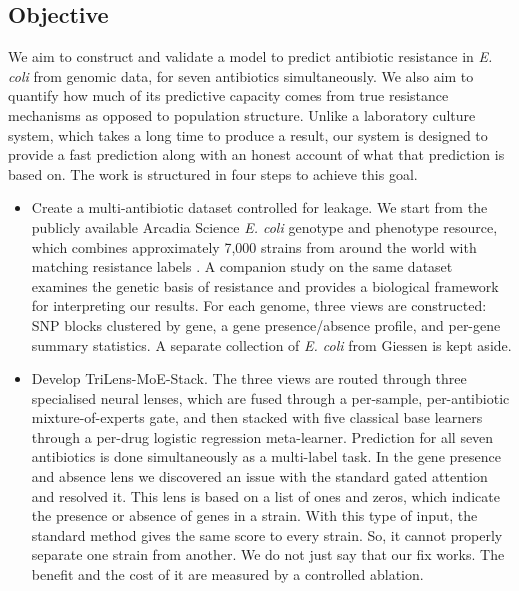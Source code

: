 \documentclass[journal]{IEEEtran}
\begin{document}
\subsection{Objective}

We aim to construct and validate a model to predict antibiotic resistance in
\textit{E. coli} from genomic data, for seven antibiotics simultaneously. We also
aim to quantify how much of its predictive capacity comes from true resistance
mechanisms as opposed to population structure. Unlike a laboratory culture system,
which takes a long time to produce a result, our system is designed to provide a
fast prediction along with an honest account of what that prediction is based on.
The work is structured in four steps to achieve this goal.

\begin{itemize}
\item Create a multi-antibiotic dataset controlled for leakage. We start from the
publicly available Arcadia Science \textit{E. coli} genotype and phenotype
resource, which combines approximately 7,000 strains from around the world with
matching resistance labels \cite{morin2024ecoli}. A companion study on the same
dataset \cite{york2025amr} examines the genetic basis of resistance and provides a
biological framework for interpreting our results. For each genome, three views
are constructed: SNP blocks clustered by gene, a gene presence/absence profile,
and per-gene summary statistics. A separate collection of \textit{E. coli} from
Giessen is kept aside.

\item Develop TriLens-MoE-Stack. The three views are routed through three
specialised neural lenses, which are fused through a per-sample, per-antibiotic
mixture-of-experts gate, and then stacked with five classical base learners
through a per-drug logistic regression meta-learner. Prediction for all seven
antibiotics is done simultaneously as a multi-label task. In the gene presence and
absence lens we discovered an issue with the standard gated attention and resolved
it. This lens is based on a list of ones and zeros, which indicate the presence or
absence of genes in a strain. With this type of input, the standard method gives
the same score to every strain. So, it cannot properly separate one strain from
another. We do not just say that our fix works. The benefit and the cost of it are
measured by a controlled ablation.


\end{itemize}
\end{document}
